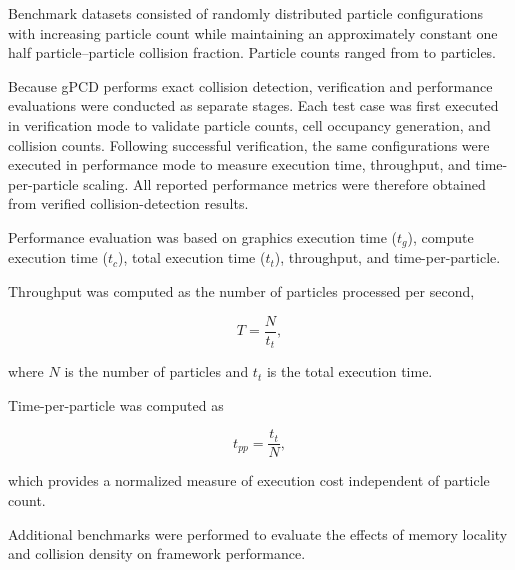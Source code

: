 Benchmark datasets consisted of randomly distributed particle
configurations with increasing particle count while maintaining an
approximately constant one half particle--particle  collision fraction. Particle counts ranged from
 to \numprint{\APBQRCURVATUREtotMaxParticles{}} particles.

Because gPCD performs exact collision detection, verification and
performance evaluations were conducted as separate stages. Each test
case was first executed in verification mode to validate particle
counts, cell occupancy generation, and collision counts. Following
successful verification, the same configurations were executed in
performance mode to measure execution time, throughput, and
time-per-particle scaling. All reported performance metrics were
therefore obtained from verified collision-detection results.

Performance evaluation was based on graphics execution time
($t_g$), compute execution time ($t_c$), total execution time
($t_t$), throughput, and time-per-particle.

Throughput was computed as the number of particles processed per
second,

\begin{equation}
T=\frac{N}{t_t},
\end{equation}

where $N$ is the number of particles and $t_t$ is the total
execution time.

Time-per-particle was computed as

\begin{equation}
t_{pp}=\frac{t_t}{N},
\end{equation}

which provides a normalized measure of execution cost independent of
particle count.

Additional benchmarks were performed to evaluate the effects of memory
locality and collision density on framework performance.
